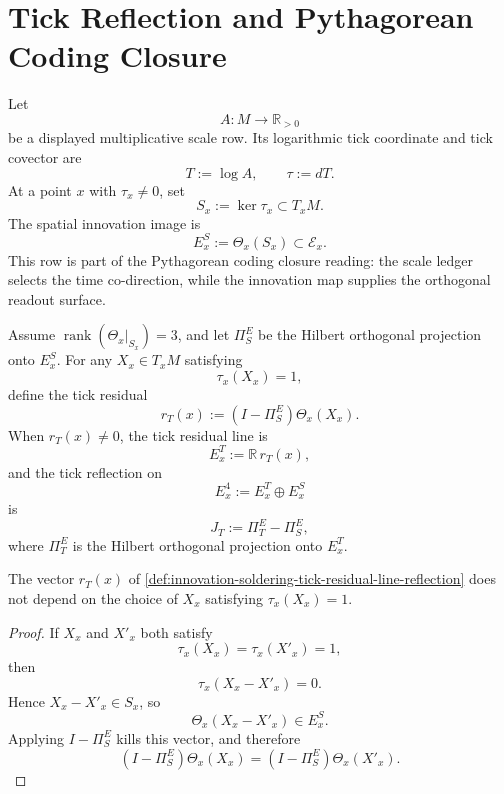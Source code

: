 \section{Tick Reflection and Pythagorean Coding Closure}
\label{sec:innovation-soldering-tick-reflection-pcc}

\begin{definition}
\label{def:innovation-soldering-tick-covector-spatial-image}
Let
$$
A:M\to\mathbb R_{>0}
$$
be a displayed multiplicative scale row. Its logarithmic tick coordinate
and tick covector are
$$
T:=\log A,
\qquad
\tau:=dT.
$$
At a point $x$ with $\tau_x\ne0$, set
$$
S_x:=\ker\tau_x\subset T_xM.
$$
The spatial innovation image is
$$
E_x^S:=\Theta_x(S_x)\subset\mathcal E_x.
$$
This row is part of the Pythagorean coding closure reading: the scale
ledger selects the time co-direction, while the innovation map supplies
the orthogonal readout surface.
\end{definition}

\begin{definition}
\label{def:innovation-soldering-tick-residual-line-reflection}
Assume $\operatorname{rank}(\Theta_x|_{S_x})=3$, and let $\Pi_S^E$ be
the Hilbert orthogonal projection onto $E_x^S$. For any
$X_x\in T_xM$ satisfying
$$
\tau_x(X_x)=1,
$$
define the tick residual
$$
r_T(x):=(I-\Pi_S^E)\Theta_x(X_x).
$$
When $r_T(x)\ne0$, the tick residual line is
$$
E_x^T:=\mathbb R\,r_T(x),
$$
and the tick reflection on
$$
E_x^4:=E_x^T\oplus E_x^S
$$
is
$$
J_T:=\Pi_T^E-\Pi_S^E,
$$
where $\Pi_T^E$ is the Hilbert orthogonal projection onto $E_x^T$.
\end{definition}

\begin{lemma}
\label{lem:innovation-soldering-tick-residual-lift-independent}
The vector $r_T(x)$ of
\autoref{def:innovation-soldering-tick-residual-line-reflection} does
not depend on the choice of $X_x$ satisfying $\tau_x(X_x)=1$.
\end{lemma}

\begin{proof}
If $X_x$ and $X'_x$ both satisfy
$$
\tau_x(X_x)=\tau_x(X'_x)=1,
$$
then
$$
\tau_x(X_x-X'_x)=0.
$$
Hence $X_x-X'_x\in S_x$, so
$$
\Theta_x(X_x-X'_x)\in E_x^S.
$$
Applying $I-\Pi_S^E$ kills this vector, and therefore
$$
(I-\Pi_S^E)\Theta_x(X_x)
=
(I-\Pi_S^E)\Theta_x(X'_x).
$$
\end{proof}

